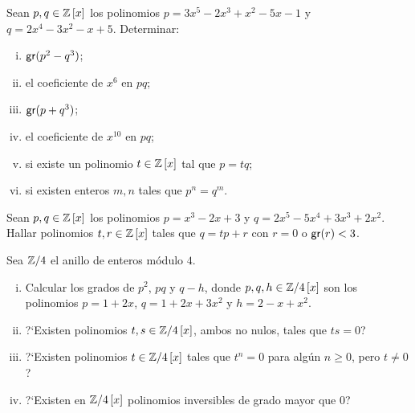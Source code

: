 \begin{ejerPolinomios}\label{ejer:polinomios:grado}
	Sean $p,q\in\polinomios\Enteros x$ los polinomios
	$p=3x^5-2x^3+x^2-5x-1$ y $q=2x^4-3x^2-x+5$. Determinar:
	\begin{enumerate}[(i)]
		\item\label{item:ejer:polinomios:grado:i}
			$\grado(p^2-q^3)$;
		\item\label{item:ejer:polinomios:grado:ii}
			el coeficiente de $x^6$ en $pq$;
		\item\label{item:ejer:polinomios:grado:iii}
			$\grado(p+q^3)$;
		\item\label{item:ejer:polinomios:grado:iv}
			el coeficiente de $x^{10}$ en $pq$;
		\item\label{item:ejer:polinomios:grado:v}
			si existe un polinomio $t\in\polinomios\Enteros x$
			tal que $p=tq$;
		\item\label{item:ejer:polinomios:grado:vi}
			si existen enteros $m,n$ tales que $p^n=q^m$.
	\end{enumerate}
\end{ejerPolinomios}

\begin{ejerPolinomios}
	Sean $p,q\in\polinomios\Enteros x$ los polinomios
	$p=x^3-2x+3$ y $q=2x^5-5x^4+3x^3+2x^2$. Hallar polinomios
	$t,r\in\polinomios\Enteros x$ tales que $q=tp+r$ con $r=0$ o
	$\grado(r)<3$.
\end{ejerPolinomios}

\begin{ejerPolinomios}\label{ejer:polinomios:grado:bis}
	Sea $\simEnterosmod[4]$ el anillo de enteros m\'odulo $4$.
	\begin{enumerate}[(i)]
		\item\label{item:ejer:polinomios:grado:bis:i}
			Calcular los grados de $p^2$, $pq$ y $q-h$,
			donde $p,q,h\in\polinomios{\simEnterosmod[4]} x$ son
			los polinomios $p=1+2x$, $q=1+2x+3x^2$ y $h=2-x+x^2$.
		\item\label{item:ejer:polinomios:grado:bis:i}
			?`Existen polinomios
			$t,s\in\polinomios{\simEnterosmod[4]} x$, ambos
			no nulos, tales que $ts=0$?
		\item\label{item:ejer:polinomios:grado:bis:i}
			?`Existen polinomios
			$t\in\polinomios{\simEnterosmod[4]} x$ tales que
			$t^n=0$ para alg\'un $n\geq 0$, pero $t\neq 0$?
		\item\label{item:ejer:polinomios:grado:bis:i}
			?`Existen en $\polinomios{\simEnterosmod[4]} x$
			polinomios inversibles de grado mayor que $0$?
	\end{enumerate}
\end{ejerPolinomios}


